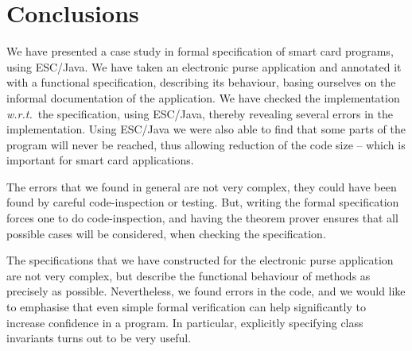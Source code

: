 \documentclass[a4paper]{llncs}
\begin{document}
\section{Conclusions}
\label{SectConcl}

We have presented a case study in formal specification of smart card
programs, using ESC/Java. We have taken an electronic purse
application and annotated it with a functional specification,
describing its behaviour, basing ourselves on the informal
documentation of the application. We have checked the implementation
\emph{w.r.t.}~the specification, using ESC/Java, thereby revealing
several errors in the implementation. Using ESC/Java we were also able 
to find that some parts of the program will never be reached, thus
allowing reduction of the code size -- which is important for smart
card applications. 

The errors that we found in general are not very complex, they could
have been found by careful code-inspection or testing. But, writing
the formal specification forces one to do code-inspection, and having
the theorem prover ensures that all possible cases will be
considered, when checking the specification.

The specifications that we have constructed for the electronic purse
application are not very complex, but describe the functional
behaviour of methods as precisely as possible. Nevertheless, we found
errors in the code, and we would like to emphasise that even simple
formal verification can help significantly to increase confidence in a
program. In particular, explicitly specifying class invariants turns
out to be very useful.
\end{document}
